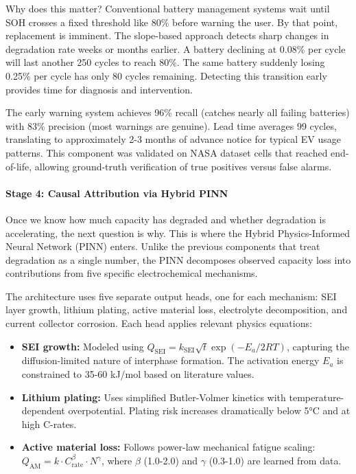\documentclass[5p,times,authoryear]{elsarticle}
\begin{document}
Why does this matter? Conventional battery management systems wait until SOH crosses a fixed threshold like 80\% before warning the user. By that point, replacement is imminent. The slope-based approach detects sharp changes in degradation rate weeks or months earlier. A battery declining at 0.08\% per cycle will last another 250 cycles to reach 80\%. The same battery suddenly losing 0.25\% per cycle has only 80 cycles remaining. Detecting this transition early provides time for diagnosis and intervention.

The early warning system achieves 96\% recall (catches nearly all failing batteries) with 83\% precision (most warnings are genuine). Lead time averages 99 cycles, translating to approximately 2-3 months of advance notice for typical EV usage patterns. This component was validated on NASA dataset cells that reached end-of-life, allowing ground-truth verification of true positives versus false alarms.

\paragraph{Stage 4: Causal Attribution via Hybrid PINN}

Once we know how much capacity has degraded and whether degradation is accelerating, the next question is why. This is where the Hybrid Physics-Informed Neural Network (PINN) enters. Unlike the previous components that treat degradation as a single number, the PINN decomposes observed capacity loss into contributions from five specific electrochemical mechanisms.

The architecture uses five separate output heads, one for each mechanism: SEI layer growth, lithium plating, active material loss, electrolyte decomposition, and current collector corrosion. Each head applies relevant physics equations:

\begin{itemize}
    \item \textbf{SEI growth:} Modeled using $Q_{\text{SEI}} = k_{\text{SEI}} \sqrt{t} \exp(-E_a/2RT)$, capturing the diffusion-limited nature of interphase formation. The activation energy $E_a$ is constrained to 35-60 kJ/mol based on literature values.
    \item \textbf{Lithium plating:} Uses simplified Butler-Volmer kinetics with temperature-dependent overpotential. Plating risk increases dramatically below 5°C and at high C-rates.
    \item \textbf{Active material loss:} Follows power-law mechanical fatigue scaling: $Q_{\text{AM}} = k \cdot C_{\text{rate}}^\beta \cdot N^\gamma$, where $\beta$ (1.0-2.0) and $\gamma$ (0.3-1.0) are learned from data.
\end{itemize}
\end{document}
